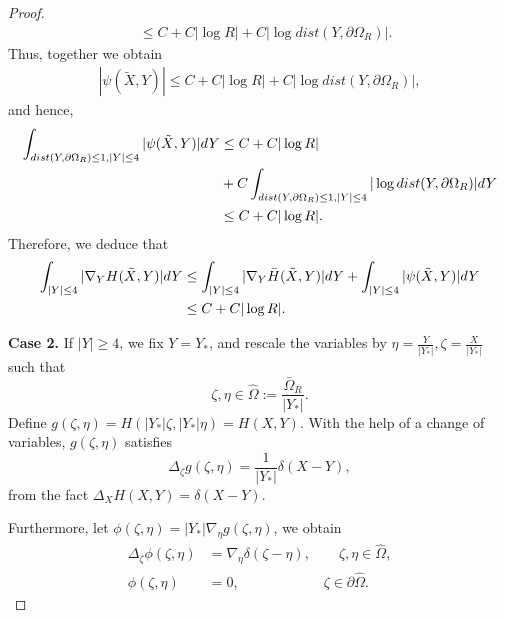 \documentclass[10pt,a4paper]{amsart}
\begin{document}
\begin{proof}
\begin{align}
&\leq C+ C |\log R|+C|\log dist(Y,\partial\Omega_{R})|.\nonumber
\end{align}
Thus, together we obtain
\begin{align}
|\psi(\tilde{X},Y)|\leq C+ C |\log R|+C|\log dist(Y,\partial\Omega_{R})|,\nonumber
\end{align}
and hence,
\begin{align}
\int_{dist(Y,\partial\Omega_{R})\leq 1, |Y|\leq 4}|\psi(\tilde{X},Y)|{\rm d}Y&\leq C + C |\log R|\nonumber\\
&+C\int_{dist(Y,\partial\Omega_{R})\leq 1, |Y|\leq 4}|\log dist(Y,\partial\Omega_{R})|{\rm d}Y\nonumber\\
&\leq C+ C |\log R|.\nonumber
\end{align}
Therefore,  we deduce that
\begin{align}
\int_{ |Y|\leq 4}|\nabla_{Y}H(\tilde{X},Y)|{\rm d}Y&\leq \int_{ |Y|\leq 4}|\nabla_{Y}\bar{H}(\tilde{X},Y)|{\rm d}Y +\int_{ |Y|\leq 4}|\psi(\tilde{X},Y)|{\rm d}Y\nonumber\\
&\leq C+C|\log R|. \nonumber
\end{align}

{\bf Case 2.}  If $|Y|\geq 4$, we fix $Y=Y_{*}$, and rescale the  variables by $\eta=\frac{Y}{|Y_{*}|}, \zeta=\frac{X}{|Y_{*}|}$ such that 
$$\zeta,\eta\in \hat{\Omega}:=\frac{\bar{\Omega}_{R}}{|Y_{*}|}.$$
Define $g(\zeta,\eta)=H(|Y_{*}|\zeta,|Y_{*}|\eta)=H(X,Y)$. With the help of a change of variables, $g(\zeta,\eta)$ satisfies
$$\Delta_{\zeta}g(\zeta,\eta)=\frac{1}{|Y_{*}|}\delta(X-Y),$$
from the fact $\Delta_{X}H(X,Y)=\delta(X-Y)$.

Furthermore, let $\phi(\zeta,\eta)=|Y_{*}|\nabla_{\eta}g(\zeta,\eta)$, we obtain
\begin{align}
\Delta_{\zeta}\phi(\zeta,\eta)&=\nabla_{\eta}\delta(\zeta-\eta),\qquad   \zeta,\eta\in\hat{\Omega},\nonumber\\
\phi(\zeta,\eta)&=0,\qquad\qquad\qquad \zeta\in\partial\hat{\Omega}.\nonumber
\end{align}


\end{proof}
\end{document}
